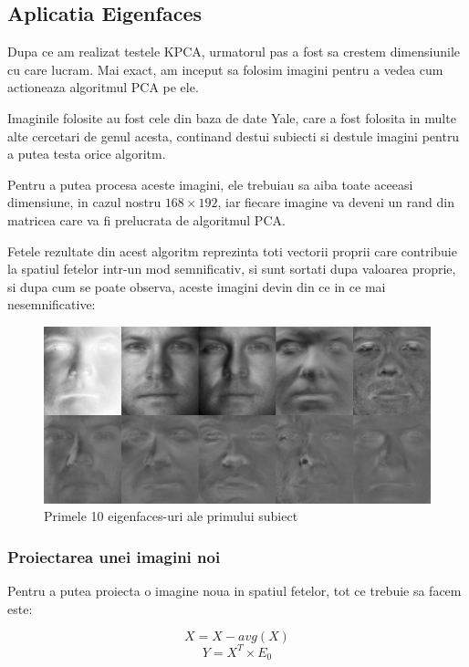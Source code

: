 \documentclass[12pt]{article}
\begin{document}
\newpage

\subsection{Aplicatia Eigenfaces}
Dupa ce am realizat testele KPCA, urmatorul pas a fost sa crestem dimensiunile cu care lucram. Mai exact, am inceput sa folosim imagini pentru a vedea cum actioneaza algoritmul PCA pe ele.

Imaginile folosite au fost cele din baza de date Yale, care a fost folosita in multe alte cercetari de genul acesta, continand destui subiecti si destule imagini pentru a putea testa orice algoritm.

Pentru a putea procesa aceste imagini, ele trebuiau sa aiba toate aceeasi dimensiune, in cazul nostru $168 \times 192$, iar fiecare imagine va deveni un rand din matricea care va fi prelucrata de algoritmul PCA.

Fetele rezultate din acest algoritm reprezinta toti vectorii proprii care contribuie la spatiul fetelor intr-un mod semnificativ, si sunt sortati dupa valoarea proprie, si dupa cum se poate observa, aceste imagini devin din ce in ce mai nesemnificative: 

\begin{figure}[H]
\centering
\caption{Primele 10 eigenfaces-uri ale primului subiect}
\includegraphics[width=\linewidth]{eigenfaces}
\end{figure}

\subsubsection{Proiectarea unei imagini noi}
Pentru a putea proiecta o imagine noua in spatiul fetelor, tot ce trebuie sa facem este: 

\begin{equation}
X=X-avg(X)
\end{equation}
\begin{equation}
Y=X^T \times E_0
\end{equation}
\end{document}
